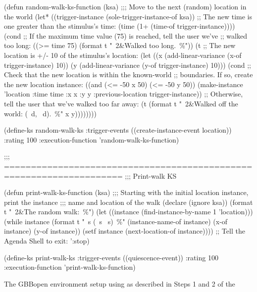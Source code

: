 \documentclass[10pt,twoside,english,pdftex]{article}
\begin{document}
\begin{tightitemize}
\begin{example}
  (defun random-walk-ks-function (ksa)
    ;;; Move to the next (random) location in the world
    (let* ((trigger-instance (sole-trigger-instance-of ksa))
           ;; The new time is one greater than the stimulus's time:
           (time (1+ (time-of trigger-instance))))
      (cond
       ;; If the maximum time value (75) is reached, tell the user we've
       ;; walked too long:
       ((>= time 75) (format t "~2&Walked too long.~\%"))
       (t ;; The new location is +/- 10 of the stimulus's location:
        (let ((x (add-linear-variance (x-of trigger-instance) 10))
              (y (add-linear-variance (y-of trigger-instance) 10)))
          (cond
           ;; Check that the new location is within the known-world
           ;; boundaries.  If so, create the new location instance:
           ((and (<= -50 x 50) (<= -50 y 50))
            (make-instance 'location 
              :time time 
              :x x 
              :y y
              :previous-location trigger-instance))
           ;; Otherwise, tell the user that we've walked too far away:
           (t (format t "~2\&Walked off the world: (~d, ~d).~\%" x y))))))))

  (define-ks random-walk-ks
      :trigger-events ((create-instance-event location))
      :rating 100
      :execution-function 'random-walk-ks-function)

  ;;; ====================================================================
  ;;;   Print-walk KS

  (defun print-walk-ks-function (ksa)
    ;;; Starting with the initial location instance, print the instance
    ;;; name and location of the walk
    (declare (ignore ksa))
    (format t "~2\&The random walk:~\%")
    (let ((instance (find-instance-by-name 1 'location)))
      (while instance
        (format t "~s (~s ~s)~\%"
                (instance-name-of instance)
                (x-of instance)
                (y-of instance))
        (setf instance (next-location-of instance))))
    ;; Tell the Agenda Shell to exit:
    ':stop)

  (define-ks print-walk-ks
    :trigger-events ((quiescence-event))
    :rating 100
    :execution-function 'print-walk-ks-function)
\end{example}

\item The GBBopen environment setup using
   as described in Steps 1
  and 2 of the 
\end{tightitemize}
\end{document}
